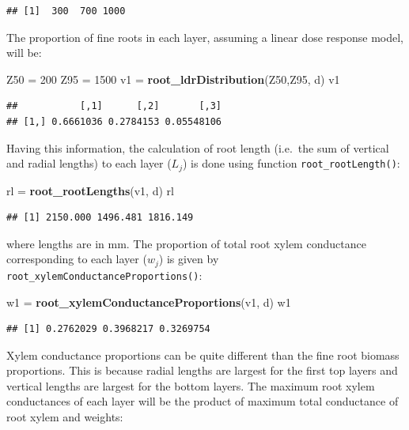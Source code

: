 \documentclass[]{book}
\newenvironment{Shaded}{\begin{snugshade}}{\end{snugshade}}
\newcommand{\KeywordTok}[1]{\textcolor[rgb]{0.13,0.29,0.53}{\textbf{#1}}}
\newcommand{\DecValTok}[1]{\textcolor[rgb]{0.00,0.00,0.81}{#1}}
\newcommand{\StringTok}[1]{\textcolor[rgb]{0.31,0.60,0.02}{#1}}
\newcommand{\NormalTok}[1]{#1}
\begin{document}
\begin{verbatim}
## [1]  300  700 1000
\end{verbatim}

The proportion of fine roots in each layer, assuming a linear dose
response model, will be:

\begin{Shaded}
\begin{Highlighting}[]
\NormalTok{Z50 =}\StringTok{ }\DecValTok{200}
\NormalTok{Z95 =}\StringTok{ }\DecValTok{1500}
\NormalTok{v1 =}\StringTok{ }\KeywordTok{root_ldrDistribution}\NormalTok{(Z50,Z95, d)}
\NormalTok{v1}
\end{Highlighting}
\end{Shaded}

\begin{verbatim}
##           [,1]      [,2]       [,3]
## [1,] 0.6661036 0.2784153 0.05548106
\end{verbatim}

Having this information, the calculation of root length (i.e.~the sum of
vertical and radial lengths) to each layer (\(L_j\)) is done using
function \texttt{root\_rootLength()}:

\begin{Shaded}
\begin{Highlighting}[]
\NormalTok{rl =}\StringTok{ }\KeywordTok{root_rootLengths}\NormalTok{(v1, d)}
\NormalTok{rl}
\end{Highlighting}
\end{Shaded}

\begin{verbatim}
## [1] 2150.000 1496.481 1816.149
\end{verbatim}

where lengths are in mm. The proportion of total root xylem conductance
corresponding to each layer (\(w_j\)) is given by
\texttt{root\_xylemConductanceProportions()}:

\begin{Shaded}
\begin{Highlighting}[]
\NormalTok{w1 =}\StringTok{ }\KeywordTok{root_xylemConductanceProportions}\NormalTok{(v1, d)}
\NormalTok{w1}
\end{Highlighting}
\end{Shaded}

\begin{verbatim}
## [1] 0.2762029 0.3968217 0.3269754
\end{verbatim}

Xylem conductance proportions can be quite different than the fine root
biomass proportions. This is because radial lengths are largest for the
first top layers and vertical lengths are largest for the bottom layers.
The maximum root xylem conductances of each layer will be the product of
maximum total conductance of root xylem and weights:
\end{document}

